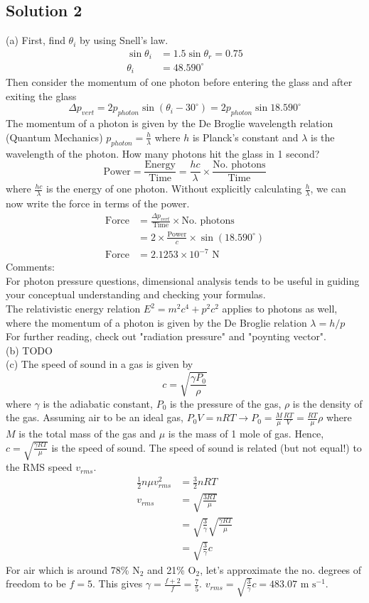 \documentclass{article}
\begin{document}
\subsection{Solution 2}
(a) First, find $\theta_i$ by using Snell's law.
\begin{align}
	\sin \theta_i &= 1.5 \sin \theta_r = 0.75 \\
	\theta_i &= 48.590^\circ
\end{align}
Then consider the momentum of one photon before entering the glass and after exiting the glass
\[\Delta p_{vert} = 2p_{photon} \sin{(\theta_i - 30^\circ)} = 2p_{photon} \sin{18.590^\circ}\]
The momentum of a photon is given by the De Broglie wavelength relation (Quantum Mechanics) $p_{photon} = \frac{h}{\lambda}$ where $h$ is Planck's constant and $\lambda$ is the wavelength of the photon. How many photons hit the glass in 1 second?
\[\text{Power} = \frac{\text{Energy}}{\text{Time}} = \frac{hc}{\lambda} \times \frac{\text{No. photons}}{\text{Time}} \]
where $\frac{hc}{\lambda}$ is the energy of one photon. Without explicitly calculating $\frac{h}{\lambda}$, we can now write the force in terms of the power.
\begin{align}
	\text{Force} &= \frac{\Delta p_{vert}}{\text{Time}} \times \text{No. photons} \\
	&= 2\times \frac{\text{Power}}{c} \times \sin(18.590^\circ) \\
	\text{Force} &= 2.1253\times 10^{-7} \text{ N}
\end{align}
Comments:\\
For photon pressure questions, dimensional analysis tends to be useful in guiding your conceptual understanding and checking your formulas.\\
The relativistic energy relation $E^2 = m^2 c^4 + p^2 c^2$ applies to photons as well, where the momentum of a photon is given by the De Broglie relation $\lambda = h/p$\\
For further reading, check out "radiation pressure" and "poynting vector".\\
(b) TODO\\
(c) The speed of sound in a gas is given by \[c=\sqrt{\frac{\gamma P_0}{\rho}}\] where $\gamma$ is the adiabatic constant, $P_0$ is the pressure of the gas, $\rho$ is the density of the gas.
Assuming air to be an ideal gas, $P_0 V = nRT\rightarrow P_0 = \frac{M}{\mu} \frac{RT}{V} = \frac{RT}{\mu} \rho$ where $M$ is the total mass of the gas and $\mu$ is the mass of 1 mole of gas.
Hence, $c=\sqrt{\frac{\gamma RT}{\mu}} $ is the speed of sound.
The speed of sound is related (but not equal!) to the RMS speed $v_{rms}$.
\begin{align}
	\frac{1}{2} n \mu v_{rms}^2 &= \frac{3}{2} nRT\\
	v_{rms} &= \sqrt{\frac{3RT}{\mu}} \\
	&= \sqrt{\frac{3}{\gamma}} \sqrt{\frac{\gamma RT}{\mu}} \\
	&= \sqrt{\frac{3}{\gamma}} c
\end{align}
For air which is around 78\% $\text{N}_2$ and 21\% $\text{O}_2$, let's approximate the no. degrees of freedom to be $f=5$. This gives $\gamma = \frac{f+2}{f} = \frac{7}{5}$.
$v_{rms} = \sqrt{\frac{3}{\gamma}} c = 483.07 \text{ m s}^{-1}$.
\end{document}
